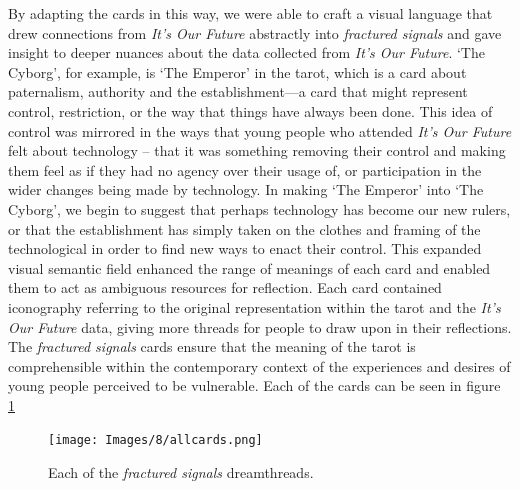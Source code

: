 By adapting the cards in this way, we were able to craft a visual language that drew connections from \emph{It's Our Future} abstractly into \emph{fractured signals} and gave insight to deeper nuances about the data collected from \emph{It's Our Future}. ‘The Cyborg’, for example, is ‘The Emperor’ in the tarot, which is a card about paternalism, authority and the establishment—a card that might represent control, restriction, or the way that things have always been done. This idea of control was mirrored in the ways that young people who attended \textit{It’s Our Future} felt about technology – that it was something removing their control and making them feel as if they had no agency over their usage of, or participation in the wider changes being made by technology. In making ‘The Emperor’ into ‘The Cyborg’, we begin to suggest that perhaps technology has become our new rulers, or that the establishment has simply taken on the clothes and framing of the technological in order to find new ways to enact their control. This expanded visual semantic field enhanced the range of meanings of each card and enabled them to act as ambiguous resources for reflection. Each card contained iconography referring to the original representation within the tarot and the \textit{It's Our Future} data, giving more threads for people to draw upon in their reflections. The\textit{ fractured signals} cards ensure that the meaning of the tarot is comprehensible within the contemporary context of the experiences and desires of young people perceived to be vulnerable. Each of the cards can be seen in figure \ref{fig:dreamthreads}

\begin{figure}
    \centering
    \texttt{[image: Images/8/allcards.png]}
    \caption{Each of the \textit{fractured signals} dreamthreads.}
    \label{fig:dreamthreads}
\end{figure}

